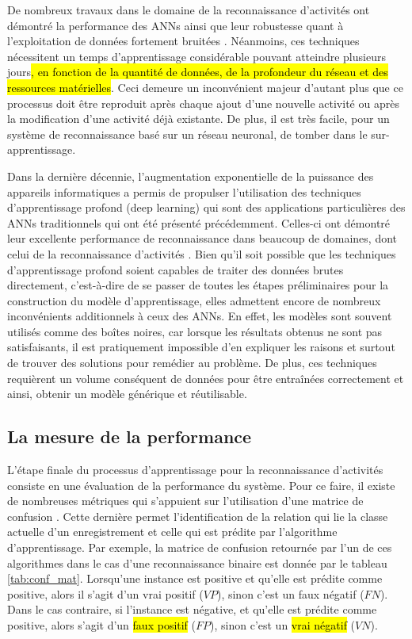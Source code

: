 De nombreux travaux dans le domaine de la reconnaissance d'activités ont démontré la performance des \acsp{ANN} ainsi que leur robustesse quant à l'exploitation de données fortement bruitées \citep{Parkka2006, Delachaux2013}. Néanmoins, ces techniques nécessitent un temps d'apprentissage considérable pouvant atteindre plusieurs jours\hl{, en fonction de la quantité de données, de la profondeur du réseau et des ressources matérielles}. Ceci demeure un inconvénient majeur d'autant plus que ce processus doit être reproduit après chaque ajout d'une nouvelle activité ou après la modification d'une activité déjà existante. De plus, il est très facile, pour un système de reconnaissance basé sur un réseau neuronal, de tomber dans le sur-apprentissage.

Dans la dernière décennie, l'augmentation exponentielle de la puissance des appareils informatiques a permis de propulser l'utilisation des techniques d'apprentissage profond (deep learning) qui sont des applications particulières des \acsp{ANN} traditionnels qui ont été présenté précédemment. Celles-ci ont démontré leur excellente performance de reconnaissance dans beaucoup de domaines, dont celui de la reconnaissance d'activités \citep{Yang2015, Li2016, Wang2018}. Bien qu'il soit possible que les techniques d'apprentissage profond soient capables de traiter des données brutes directement, c'est-à-dire de se passer de toutes les étapes préliminaires pour la construction du modèle d'apprentissage, elles admettent encore de nombreux inconvénients additionnels à ceux des \acsp{ANN}. En effet, les modèles sont souvent utilisés comme des boîtes noires, car lorsque les résultats obtenus ne sont pas satisfaisants, il est pratiquement impossible d'en expliquer les raisons et surtout de trouver des solutions pour remédier au problème. De plus, ces techniques requièrent un volume conséquent de données pour être entraînées correctement et ainsi, obtenir un modèle générique et réutilisable.

\subsection{La mesure de la performance}

L'étape finale du processus d'apprentissage pour la reconnaissance d'activités consiste en une évaluation de la performance du système. Pour ce faire, il existe de nombreuses métriques qui s'appuient sur l'utilisation d'une matrice de confusion \citep{Fawcett2006}. Cette dernière permet l'identification de la relation qui lie la classe actuelle d'un enregistrement et celle qui est prédite par l'algorithme d'apprentissage. Par exemple, la matrice de confusion retournée par l'un de ces algorithmes dans le cas d'une reconnaissance binaire est donnée par le tableau \ref{tab:conf_mat}. Lorsqu'une instance est positive et qu'elle est prédite comme positive, alors il s'agit d'un vrai positif ($VP$), sinon c'est un faux négatif ($FN$). Dans le cas contraire, si l'instance est négative, et qu'elle est prédite comme positive, alors s'agit d'un \hl{faux positif} ($FP$), sinon c'est un \hl{vrai négatif} ($VN$).

